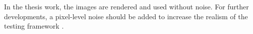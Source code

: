 In the thesis work, the images are rendered and used without noise. For further developments, a pixel-level noise should be added to increase the realism of the testing framework \cite{BECHINI2023358}.
